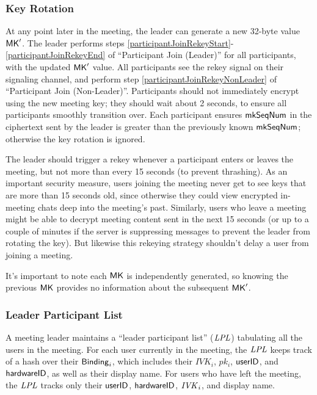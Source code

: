 \subsubsection{Key Rotation}
\label{subsubsec:keyrotation}
At any point later in the meeting, the leader can generate a new 32-byte value ${\sf MK}'$. The leader
performs steps \ref{participantJoinRekeyStart}-\ref{participantJoinRekeyEnd} of ``Participant Join
(Leader)'' for all participants, with the updated ${\sf MK}'$ value. All participants see the rekey
signal on their signaling channel, and perform step \ref{participantJoinRekeyNonLeader} of
``Participant Join (Non-Leader)''. Participants should not immediately encrypt using the new meeting
key; they should wait about 2 seconds, to ensure all participants smoothly transition over. Each
participant ensures $\mathsf{mkSeqNum}$ in the ciphertext sent by the leader is greater than the
previously known $\mathsf{mkSeqNum}$; otherwise the key rotation is ignored.

The leader should trigger a rekey whenever a participant enters or leaves the meeting, but not more
than every 15 seconds (to prevent thrashing). As an important security measure, users joining the
meeting never get to see keys that are more than 15 seconds old, since otherwise they could view
encrypted in-meeting chats deep into the meeting's past. Similarly, users who leave a meeting might
be able to decrypt meeting content sent in the next 15 seconds (or up to a couple of minutes if the
server is suppressing messages to prevent the leader from rotating the key). But likewise this
rekeying strategy shouldn't delay a user from joining a meeting.

It's important to note each ${\sf MK}$ is independently generated, so knowing the previous ${\sf MK}$ provides no information about the subsequent ${\sf MK}'$.

\subsubsection{Leader Participant List}\label{subsubsec:lpl}

A meeting leader maintains a ``leader participant list'' ($\mathit{LPL}$) tabulating all the users in the meeting. For each user
currently in the meeting, the $\mathit{LPL}$ keeps track of a hash over their ${\sf Binding}_i$, which includes their $IVK_i$,
$pk_i$, $\mathsf{userID}$, and ${\sf hardwareID}$, as well as their display name. For users who have left the meeting, the $\mathit{LPL}$
tracks only their $\mathsf{userID}$, ${\sf hardwareID}$, $\mathit{IVK}_i$, and display name.

